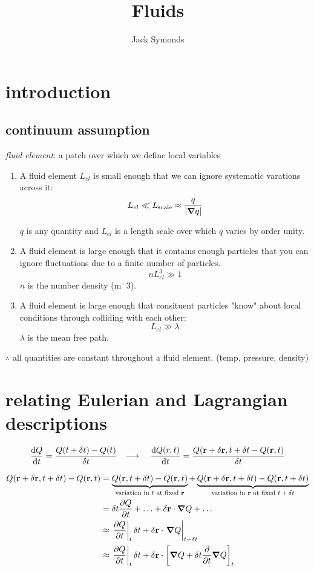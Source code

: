 \documentclass[10pt, a4paper, twocolumn]{article}
\author{Jack Symonds}
\title{Fluids}
\date{}
\newcommand{\deff}[1]{\par \noindent \textit{#1}: }
\newcommand{\arr}{\ensuremath{\longrightarrow\ }}
\begin{document}
\maketitle
\section{introduction}
\subsection{continuum assumption}

\deff{fluid element}
a patch over which we define local variables
\begin{enumerate}

\item A fluid element $L_{el}$ is small enough that we can ignore systematic varations across it:
\[L_{el}\ll L_\mathrm{scale}
\approx\frac{q}{\abs{\grad q}}\]

$q$ is any quantity and $L_{el}$ is a length scale over which $q$ varies by order unity.

\item A fluid element is large enough that it contains enough particles that you can ignore fluctuations due to a finite number of particles.
\[nL_{el}^3\gg 1\]
$n$ is the number density (m$^-3$).

\item A fluid element is large enough that consituent particles "know" about local conditions through colliding with each other:
\[L_{el}\gg\lambda\]
$\lambda$ is the mean free path.
\end{enumerate}

$\therefore$ all quantities are constant throughout a fluid element.
(temp, pressure, density)

\section{relating Eulerian and Lagrangian descriptions}

\[\dv{Q}{t}
=\frac{Q(t+\delta t)-Q(t)}{\delta t}
\qq{\arr}
\dv{Q(r,t)}{t}
=\frac{Q(\vb r+\delta \vb r,t+\delta t
-Q(\vb r,t)}{\delta t}
\]

\begin{equation*}
\begin{aligned}
Q(\vb r+\delta \vb r,t+\delta t)
-Q(\vb r,t)
&=
\underbrace{Q(\vb r,t+\delta t)
-Q(\vb r,t)}
_\text{variation in $t$ at fixed $\vb r$}
+
\underbrace{Q(\vb r+\delta \vb r,t+\delta t)
-Q(\vb r,t+\delta t)}
_\text{variation in $\vb r$ at fixed $t+\delta t$}
\\&=\delta t\pdv{Q}{t}+\ldots
+\delta \vb r\cdot \grad Q +\ldots
\\&\approx
\eval{\pdv{Q}{t}}_t
\delta t+\delta\vb r\cdot
\eval{\grad{Q}}_{t+\delta t}
\\&\approx
\eval{\pdv{Q}{t}}_t
\delta t+\delta\vb r\cdot
\bqty{\grad Q +\delta t\pdv{t} \grad Q}_t
\end{aligned}
\end{equation*}
\end{document}
